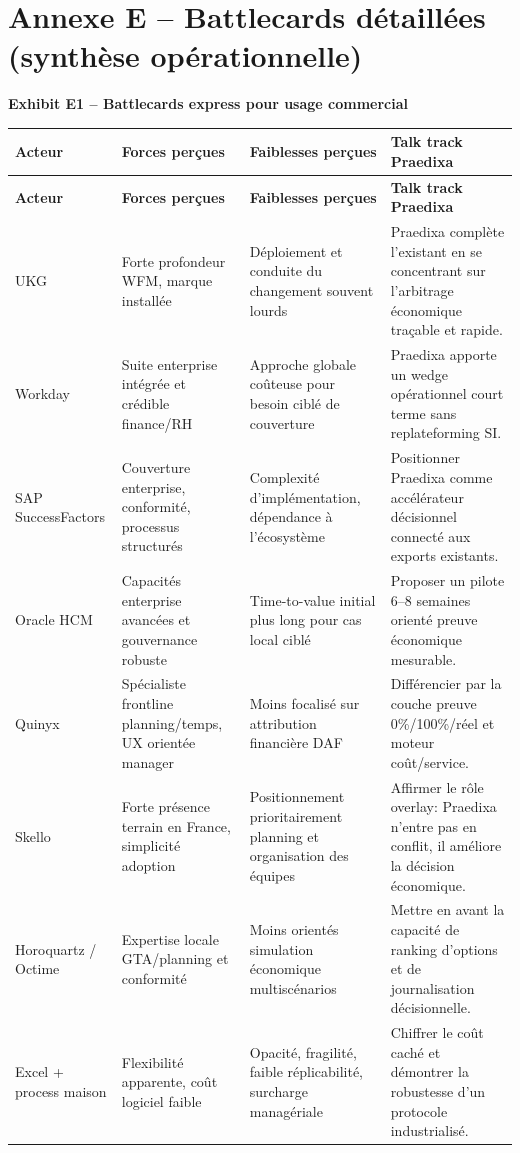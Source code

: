 \documentclass[11pt,a4paper]{article}
\newcommand{\exhibit}[1]{\vspace{2mm}\noindent\colorbox{PraedixaLight}{\parbox{\dimexpr\linewidth-2\fboxsep\relax}{\textbf{#1}}}\vspace{1mm}}
\begin{document}
\section{Annexe E -- Battlecards détaillées (synthèse opérationnelle)}
\exhibit{Exhibit E1 -- Battlecards express pour usage commercial}
\small
\begin{longtable}{@{}p{2.5cm}p{3.9cm}p{3.9cm}p{5.5cm}@{}}
\toprule
\textbf{Acteur} & \textbf{Forces perçues} & \textbf{Faiblesses perçues} & \textbf{Talk track Praedixa} \\
\midrule
\endfirsthead
\toprule
\textbf{Acteur} & \textbf{Forces perçues} & \textbf{Faiblesses perçues} & \textbf{Talk track Praedixa} \\
\midrule
\endhead
UKG & Forte profondeur WFM, marque installée & Déploiement et conduite du changement souvent lourds & Praedixa complète l'existant en se concentrant sur l'arbitrage économique traçable et rapide. \\
Workday & Suite enterprise intégrée et crédible finance/RH & Approche globale coûteuse pour besoin ciblé de couverture & Praedixa apporte un wedge opérationnel court terme sans replateforming SI. \\
SAP SuccessFactors & Couverture enterprise, conformité, processus structurés & Complexité d'implémentation, dépendance à l'écosystème & Positionner Praedixa comme accélérateur décisionnel connecté aux exports existants. \\
Oracle HCM & Capacités enterprise avancées et gouvernance robuste & Time-to-value initial plus long pour cas local ciblé & Proposer un pilote 6--8 semaines orienté preuve économique mesurable. \\
Quinyx & Spécialiste frontline planning/temps, UX orientée manager & Moins focalisé sur attribution financière DAF & Différencier par la couche preuve 0\%/100\%/réel et moteur coût/service. \\
Skello & Forte présence terrain en France, simplicité adoption & Positionnement prioritairement planning et organisation des équipes & Affirmer le rôle overlay: Praedixa n'entre pas en conflit, il améliore la décision économique. \\
Horoquartz / Octime & Expertise locale GTA/planning et conformité & Moins orientés simulation économique multiscénarios & Mettre en avant la capacité de ranking d'options et de journalisation décisionnelle. \\
Excel + process maison & Flexibilité apparente, coût logiciel faible & Opacité, fragilité, faible réplicabilité, surcharge managériale & Chiffrer le coût caché et démontrer la robustesse d'un protocole industrialisé. \\
\bottomrule
\end{longtable}
\normalsize
\end{document}
